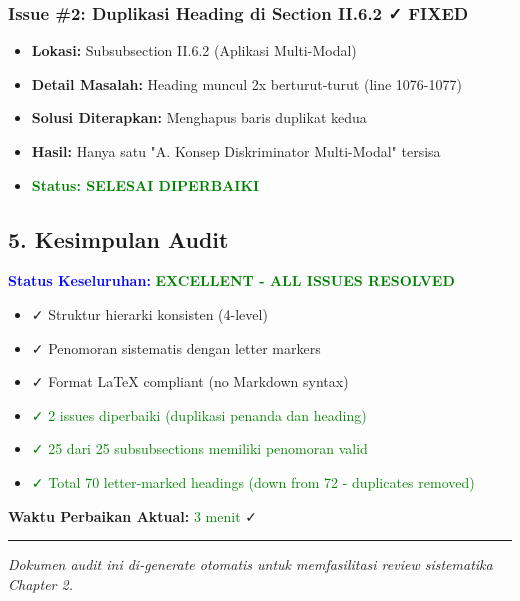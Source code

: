 \documentclass[11pt,a4paper]{article}
\begin{document}
\subsubsection*{Issue \#2: Duplikasi Heading di Section II.6.2 ✓ FIXED}
\begin{itemize}[leftmargin=*]
    \item \textbf{Lokasi:} Subsubsection II.6.2 (Aplikasi Multi-Modal)
    \item \textbf{Detail Masalah:} Heading muncul 2x berturut-turut (line 1076-1077)
    \item \textbf{Solusi Diterapkan:} Menghapus baris duplikat kedua
    \item \textbf{Hasil:} Hanya satu "A. Konsep Diskriminator Multi-Modal" tersisa
    \item \textcolor{green}{\textbf{Status: SELESAI DIPERBAIKI}}
\end{itemize}

\subsection*{5. Kesimpulan Audit}

\textcolor{blue}{\textbf{Status Keseluruhan:}} \textcolor{green}{\textbf{EXCELLENT - ALL ISSUES RESOLVED}}

\begin{itemize}[leftmargin=*]
    \item ✓ Struktur hierarki konsisten (4-level)
    \item ✓ Penomoran sistematis dengan letter markers
    \item ✓ Format LaTeX compliant (no Markdown syntax)
    \item \textcolor{green}{✓ 2 issues diperbaiki (duplikasi penanda dan heading)}
    \item \textcolor{green}{✓ 25 dari 25 subsubsections memiliki penomoran valid}
    \item \textcolor{green}{✓ Total 70 letter-marked headings (down from 72 - duplicates removed)}
\end{itemize}

\textbf{Waktu Perbaikan Aktual:} \textcolor{green}{3 menit} ✓

\vspace{2em}
\hrule
\vspace{0.5em}
\textit{Dokumen audit ini di-generate otomatis untuk memfasilitasi review sistematika Chapter 2.}
\end{document}
